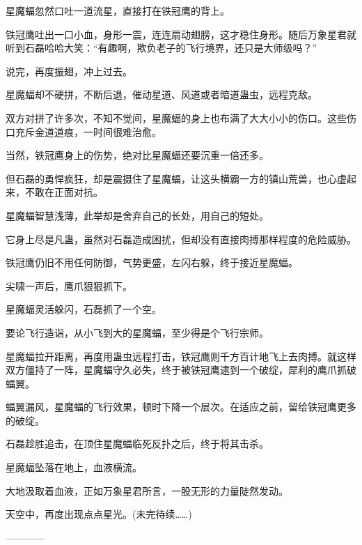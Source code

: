 \begin{this_body}
星魔蝠忽然口吐一道流星，直接打在铁冠鹰的背上。

铁冠鹰吐出一口小血，身形一震，连连扇动翅膀，这才稳住身形。随后万象星君就听到石磊哈哈大笑：“有趣啊，欺负老子的飞行境界，还只是大师级吗？”

说完，再度振翅，冲上过去。

星魔蝠却不硬拼，不断后退，催动星道、风道或者暗道蛊虫，远程克敌。

双方对拼了许多次，不知不觉间，星魔蝠的身上也布满了大大小小的伤口。这些伤口充斥金道道痕，一时间很难治愈。

当然，铁冠鹰身上的伤势，绝对比星魔蝠还要沉重一倍还多。

但石磊的勇悍疯狂，却是震摄住了星魔蝠，让这头横霸一方的镇山荒兽，也心虚起来，不敢在正面对抗。

星魔蝠智慧浅薄，此举却是舍弃自己的长处，用自己的短处。

它身上尽是凡蛊，虽然对石磊造成困扰，但却没有直接肉搏那样程度的危险威胁。

铁冠鹰仍旧不用任何防御，气势更盛，左闪右躲，终于接近星魔蝠。

尖啸一声后，鹰爪狠狠抓下。

星魔蝠灵活躲闪，石磊抓了一个空。

要论飞行造诣，从小飞到大的星魔蝠，至少得是个飞行宗师。

星魔蝠拉开距离，再度用蛊虫远程打击，铁冠鹰则千方百计地飞上去肉搏。就这样双方僵持了一阵，星魔蝠守久必失，终于被铁冠鹰逮到一个破绽，犀利的鹰爪抓破蝠翼。

蝠翼漏风，星魔蝠的飞行效果，顿时下降一个层次。在适应之前，留给铁冠鹰更多的破绽。

石磊趁胜追击，在顶住星魔蝠临死反扑之后，终于将其击杀。

星魔蝠坠落在地上，血液横流。

大地汲取着血液，正如万象星君所言，一股无形的力量陡然发动。

天空中，再度出现点点星光。(未完待续……)

------------

\end{this_body}

